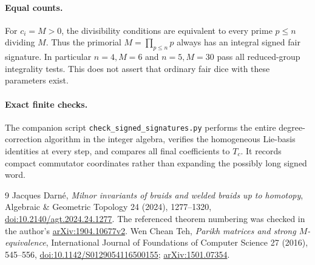 \documentclass[11pt]{article}
\begin{document}
\paragraph{Equal counts.}
For $c_i=M>0$, the divisibility conditions are equivalent to every prime
$p\le n$ dividing $M$. Thus the primorial $M=\prod_{p\le n}p$ always
has an integral signed fair signature. In particular $n=4,M=6$ and
$n=5,M=30$ pass all reduced-group integrality tests. This does not assert
that ordinary fair dice with these parameters exist.

\paragraph{Exact finite checks.}
The companion script \texttt{check\_signed\_signatures.py} performs the
entire degree-correction algorithm in the integer algebra, verifies the
homogeneous Lie-basis identities at every step, and compares all final
coefficients to $T_c$. It records compact commutator coordinates rather
than expanding the possibly long signed word.
\begin{thebibliography}{9}
 Jacques Darn\'e,
\emph{Milnor invariants of braids and welded braids up to homotopy},
Algebraic \& Geometric Topology 24 (2024), 1277--1320,
\href{https://doi.org/10.2140/agt.2024.24.1277}{doi:10.2140/agt.2024.24.1277}.
The referenced theorem numbering was checked in the author's
\href{https://arxiv.org/abs/1904.10677}{arXiv:1904.10677v2}.
 Wen Chean Teh,
\emph{Parikh matrices and strong $M$-equivalence},
International Journal of Foundations of Computer Science 27 (2016),
545--556,
\href{https://doi.org/10.1142/S0129054116500155}{doi:10.1142/S0129054116500155};
\href{https://arxiv.org/abs/1501.07354}{arXiv:1501.07354}.
\end{thebibliography}
\end{document}
